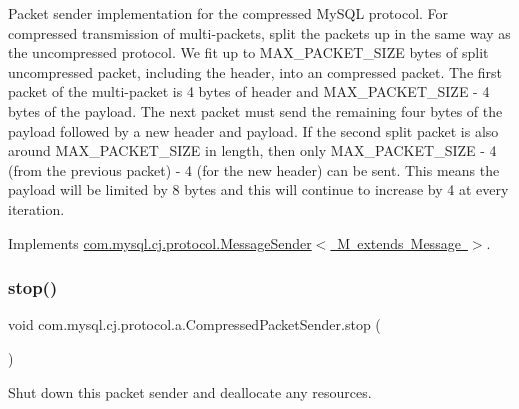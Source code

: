 Packet sender implementation for the compressed My\+S\+QL protocol. For compressed transmission of multi-\/packets, split the packets up in the same way as the uncompressed protocol. We fit up to M\+A\+X\+\_\+\+P\+A\+C\+K\+E\+T\+\_\+\+S\+I\+ZE bytes of split uncompressed packet, including the header, into an compressed packet. The first packet of the multi-\/packet is 4 bytes of header and M\+A\+X\+\_\+\+P\+A\+C\+K\+E\+T\+\_\+\+S\+I\+ZE -\/ 4 bytes of the payload. The next packet must send the remaining four bytes of the payload followed by a new header and payload. If the second split packet is also around M\+A\+X\+\_\+\+P\+A\+C\+K\+E\+T\+\_\+\+S\+I\+ZE in length, then only M\+A\+X\+\_\+\+P\+A\+C\+K\+E\+T\+\_\+\+S\+I\+ZE -\/ 4 (from the previous packet) -\/ 4 (for the new header) can be sent. This means the payload will be limited by 8 bytes and this will continue to increase by 4 at every iteration. 

Implements \mbox{\hyperlink{interfacecom_1_1mysql_1_1cj_1_1protocol_1_1_message_sender}{com.\+mysql.\+cj.\+protocol.\+Message\+Sender$<$ M extends Message $>$}}.

\mbox{\label{classcom_1_1mysql_1_1cj_1_1protocol_1_1a_1_1_compressed_packet_sender_a5491c16d427d8343f0417b9e5bebd1f1}} 
\subsubsection{\texorpdfstring{stop()}{stop()}}
{\footnotesize\ttfamily void com.\+mysql.\+cj.\+protocol.\+a.\+Compressed\+Packet\+Sender.\+stop (\begin{DoxyParamCaption}{ }\end{DoxyParamCaption})}

Shut down this packet sender and deallocate any resources. \mbox{\label{classcom_1_1mysql_1_1cj_1_1protocol_1_1a_1_1_compressed_packet_sender_a3784dddfd77b45c384a6bb19f67fc2cc}} 
